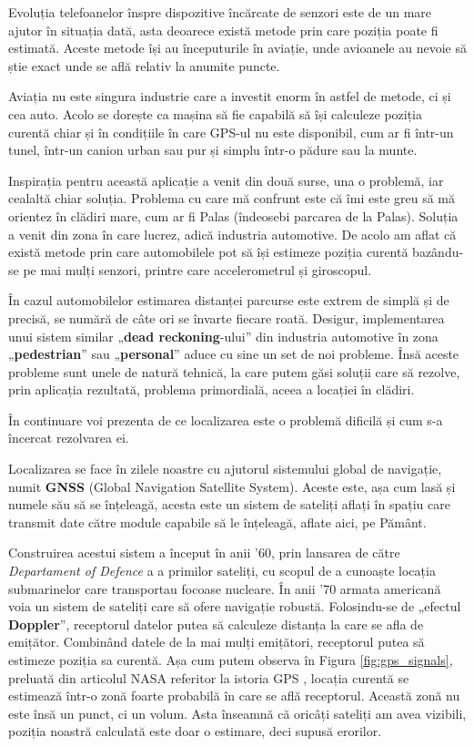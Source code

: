 \documentclass[12pt,a4paper]{article}
\begin{document}
Evoluția telefoanelor înspre dispozitive încărcate de senzori este de un mare ajutor în situația dată, asta deoarece există metode prin care poziția poate fi estimată. Aceste metode își au începuturile în aviație, unde avioanele au nevoie să știe exact unde se află relativ la anumite puncte. 

Aviația nu este singura industrie care a investit enorm în astfel de metode, ci și cea auto. Acolo se dorește ca mașina să fie capabilă să își calculeze poziția curentă chiar și în condițiile în care GPS-ul nu este disponibil, cum ar fi într-un tunel, într-un canion urban sau pur și simplu într-o pădure sau la munte.

Inspirația pentru această aplicație a venit din două surse, una o problemă, iar cealaltă chiar soluția. Problema cu care mă confrunt este că îmi este greu să mă orientez în clădiri mare, cum ar fi Palas (îndeosebi parcarea de la Palas). Soluția a venit din zona în care lucrez, adică industria automotive. De acolo am aflat că există metode prin care automobilele pot să își estimeze poziția curentă bazându-se pe mai mulți senzori, printre care accelerometrul și giroscopul. 

În cazul automobilelor estimarea distanței parcurse este extrem de simplă și de precisă, se numără de câte ori se învarte fiecare roată. Desigur, implementarea unui sistem similar „\textbf{dead reckoning}-ului” din industria automotive în zona „\textbf{pedestrian}” sau „\textbf{personal}” aduce cu sine un set de noi probleme. Însă aceste probleme sunt unele de natură tehnică, la care putem găsi soluții care să rezolve, prin aplicația rezultată, problema primordială, aceea a locației în clădiri.

În continuare voi prezenta de ce localizarea este o problemă dificilă și cum s-a încercat rezolvarea ei.

Localizarea se face în zilele noastre cu ajutorul sistemului global de navigație, numit \textbf{GNSS} (Global Navigation Satellite System). Aceste este, așa cum lasă și numele său să se înțeleagă, acesta este un sistem de sateliți aflați în spațiu care transmit date către module capabile să le înțeleagă, aflate aici, pe Pământ.

Construirea acestui sistem a început în anii '60, prin lansarea de către \textit{Departament of Defence} a a primilor sateliți, cu scopul de a cunoaște locația submarinelor care transportau focoase nucleare. În anii '70
armata americană voia un sistem de sateliți care să ofere navigație robustă. Folosindu-se de „efectul \textbf{Doppler}”, receptorul datelor putea să calculeze distanța la care se afla de emițător. Combinând datele de la mai mulți emițători, receptorul putea să estimeze poziția sa curentă. Așa cum putem observa în Figura \ref{fig:gps_signals}, preluată din articolul NASA referitor la istoria GPS \cite{GPSHistoryNASA}, locația curentă se estimează într-o zonă foarte probabilă în care se află receptorul. Această zonă nu este însă un punct, ci un volum. Asta înseamnă că oricâți sateliți am avea vizibili, poziția noastră calculată este doar o estimare, deci supusă erorilor.
\end{document}
